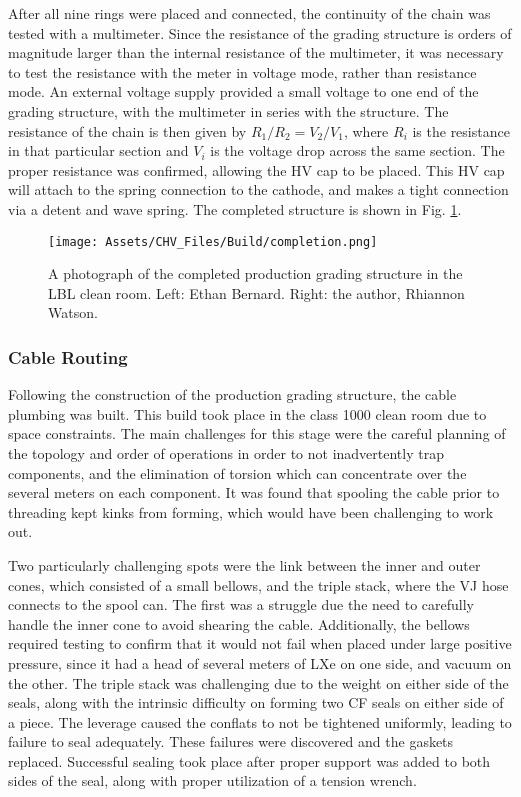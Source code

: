 After all nine rings were placed and connected, the continuity of the chain was tested with a multimeter.
Since the resistance of the grading structure is orders of magnitude larger than the internal resistance of the multimeter, it was necessary to test the resistance with the meter in voltage mode, rather than resistance mode. An external voltage supply provided a small voltage to one end of the grading structure, with the multimeter in series with the structure.
The resistance of the chain is then given by $R_1/R_2 = V_2/V_1$, where $R_i$ is the resistance in that particular section and $V_i$ is the voltage drop across the same section.
The proper resistance was confirmed, allowing the HV cap to be placed.
This HV cap will attach to the spring connection to the cathode, and makes a tight connection via a detent and wave spring.
The completed structure is shown in Fig. \ref{fig:completed_grading_structure}.
\begin{figure}
    \centering
    \texttt{[image: Assets/CHV\_Files/Build/completion.png]}
    \caption[A photograph of the completed production grading structure in the LBL clean room. ]%
    {A photograph of the completed production grading structure in the LBL clean room. 
    Left: Ethan Bernard. Right: the author, Rhiannon Watson.}
    \label{fig:completed_grading_structure}
\end{figure}
\subsubsection{Cable Routing}
Following the construction of the production grading structure, the cable plumbing was built.
This build took place in the class 1000 clean room due to space constraints.
The main challenges for this stage were the careful planning of the topology and order of operations in order to not inadvertently trap components, and the elimination of torsion which can concentrate over the several meters on each component.
It was found that spooling the cable prior to threading kept kinks from forming, which would have been challenging to work out.

Two particularly challenging spots were the link between the inner and outer cones, which consisted of a small bellows, and the triple stack, where the VJ hose connects to the spool can.
The first was a struggle due the need to carefully handle the inner cone to avoid shearing the cable.
Additionally, the bellows required testing to confirm that it would not fail when placed under large positive pressure, since it had a head of several meters of LXe on one side, and vacuum on the other.
The triple stack was challenging due to the weight on either side of the seals, along with the intrinsic difficulty on forming two CF seals on either side of a piece.
The leverage caused the conflats to not be tightened uniformly, leading to failure to seal adequately.
These failures were discovered and the gaskets replaced.
Successful sealing took place after proper support was added to both sides of the seal, along with proper utilization of a tension wrench.

